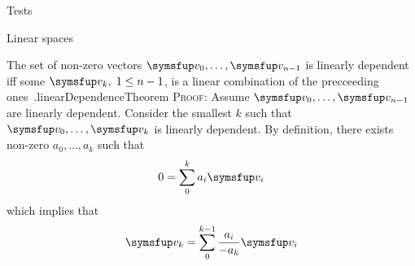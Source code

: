 \documentclass{PalisadesLakesArticle}
\begin{document}
\begin{plSection}{Tests}
\begin{plSection}{Linear spaces}
\begin{plTheorem}{The set of non-zero vectors
 $\Vector{v}_0, \ldots ,\Vector{v}_{n-1}$
is linearly dependent iff some $\Vector{v}_k, \; 1 \leq n-1$, 
is a linear combination of the precceeding 
ones~\cite[Section 6]{Halmos:1958:Finite}.}{linearDependenceTheorem}
\textsc{Proof:}
Assume  $\Vector{v}_0, \ldots ,\Vector{v}_{n-1}$ are linearly dependent.
Consider the smallest $k$ such that 
$\Vector{v}_0, \ldots ,\Vector{v}_{k}$ is linearly dependent.
By definition,
there exists non-zero $a_0, \ldots ,a_{k}$ such that
\begin{equation}
0 = \sum_0^k a_i \Vector{v}_i
\end{equation}
which implies that
\begin{equation}
\Vector{v}_k = \sum_0^{k-1} \frac{a_i}{- a_k} \Vector{v}_i
\end{equation}
\end{plTheorem}


\end{plSection}
\end{plSection}
\end{document}
